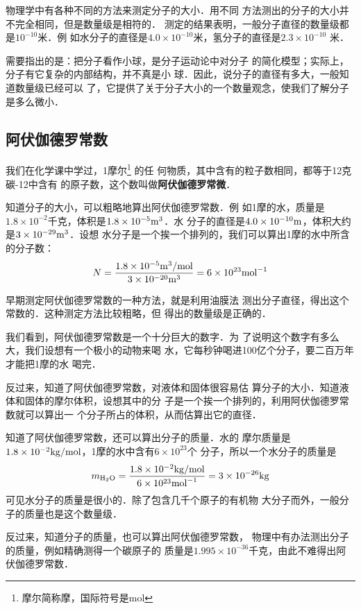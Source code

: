     物理学中有各种不同的方法来测定分子的大小．用不同
方法测出的分子的大小并不完全相同，但是数量级是相符的．
测定的结果表明，一般分子直径的数量级都是$10^{-10}$米．例
如水分子的直径是$4.0\times 10^{-10}$米，氢分子的直径是$2.3\times 10^{-10}$
米．

    需要指出的是：把分子看作小球，是分子运动论中对分子
的简化模型；实际上，分子有它复杂的内部结构，并不真是小
球．因此，说分子的直径有多大，一般知道数量级已经可以
了，它提供了关于分子大小的一个数量观念，使我们了解分子
是多么微小．

    \subsection{阿伏伽德罗常数}

我们在化学课中学过，1摩尔\footnote{摩尔简称摩，国际符号是mol}
的任
何物质，其中含有的粒子数相同，都等于12克碳-12中含有
的原子数，这个数叫做\textbf{阿伏伽德罗常微}．

    知道分子的大小，可以粗略地算出阿伏伽德罗常数．例
如1摩的水，质量是$1.8\times 10^{-2}$千克，体积是$1.8\times 10^{-5}{\rm m}^3$．水
分子的直径是$4.0\times 10^{-10}{\rm m}$，体积大约是$3\times 10^{-29}{\rm m}^3$．设想
水分子是一个挨一个排列的，我们可以算出1摩的水中所含
的分子数：
\[N=\frac{1.8\times 10^{-5}{\rm m^3/mol}}{3\times 10^{-20}{\rm m^3}}=6\times 10^{23}{\rm mol}^{-1} \]

    早期测定阿伏伽德罗常数的一种方法，就是利用油膜法
测出分子直径，得出这个常数的．这种测定方法比较粗略，但
得出的数量级是正确的．

    我们看到，阿伏伽德罗常数是一个十分巨大的数字．为
了说明这个数字有多么大，我们设想有一个极小的动物来喝
水，它每秒钟喝进100亿个分子，要二百万年才能把1摩的水
喝完．

    反过来，知道了阿伏伽德罗常数，对液体和固体很容易估
算分子的大小．知道液体和固体的摩尔体积，设想其中的分
子是一个挨一个排列的，利用阿伏伽德罗常数就可以算出一
个分子所占的体积，从而估算出它的直径．

    知道了阿伏伽德罗常数，还可以算出分子的质量．水的
摩尔质量是$1.8\times 10^{-2}{\rm kg/mol}$，1摩的水中含有$6\times 10^{23}$个
分子，所以一个水分子的质量是
\[m_{\rm H_2 O}=\frac{1.8\times 10^{-2}{\rm kg/mol}}{6\times 10^{23}{\rm mol}^{-1}}=3\times 10^{-26}{\rm kg} \]
可见水分子的质量是很小的．除了包含几千个原子的有机物
大分子而外，一般分子的质量也是这个数量级．

    反过来，知道分子的质量，也可以算出阿伏伽德罗常数，
物理中有办法测出分子的质量，例如精确测得一个碳原子的
质量是$1.995\times 10^{-36}$千克，由此不难得出阿伏伽德罗常数．

